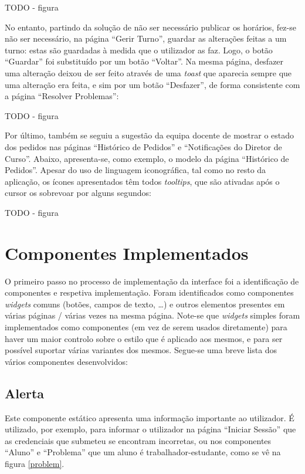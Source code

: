 \documentclass[12pt, a4paper]{article}
\begin{document}
{\color{red} TODO - figura}

No entanto, partindo da solução de não ser necessário publicar os horários, fez-se não ser
necessário, na página ``Gerir Turno'', guardar as alterações feitas a um turno: estas são guardadas
à medida que o utilizador as faz. Logo, o botão ``Guardar'' foi substituído por um botão ``Voltar''.
Na mesma página, desfazer uma alteração deixou de ser feito através de uma \emph{toast} que aparecia
sempre que uma alteração era feita, e sim por um botão ``Desfazer'', de forma consistente com a
página ``Resolver Problemas'':

{\color{red} TODO - figura}

Por último, também se seguiu a sugestão da equipa docente de mostrar o estado dos pedidos nas
páginas ``Histórico de Pedidos'' e ``Notificações do Diretor de Curso''. Abaixo, apresenta-se, como
exemplo, o modelo da página ``Histórico de Pedidos''. Apesar do uso de linguagem iconográfica, tal
como no resto da aplicação, os ícones apresentados têm todos \emph{tooltips}, que são ativadas após
o cursor os sobrevoar por alguns segundos:

{\color{red} TODO - figura}

\section{Componentes Implementados}

O primeiro passo no processo de implementação da interface foi a identificação de componentes e
respetiva implementação. Foram identificados como componentes \emph{widgets} comuns (botões, campos
de texto, \ldots) e outros elementos presentes em várias páginas / várias vezes na mesma página.
Note-se que \emph{widgets} simples foram implementados como componentes (em vez de serem usados
diretamente) para haver um maior controlo sobre o estilo que é aplicado aos mesmos, e para ser
possível suportar várias variantes dos mesmos. Segue-se uma breve lista dos vários componentes
desenvolvidos:

\subsection{Alerta}

Este componente estático apresenta uma informação importante ao utilizador. É utilizado, por
exemplo, para informar o utilizador na página ``Iniciar Sessão'' que as credenciais que submeteu
se encontram incorretas, ou nos componentes ``Aluno'' e ``Problema'' que um aluno é
trabalhador-estudante, como se vê na figura \ref{problem}.
\end{document}

